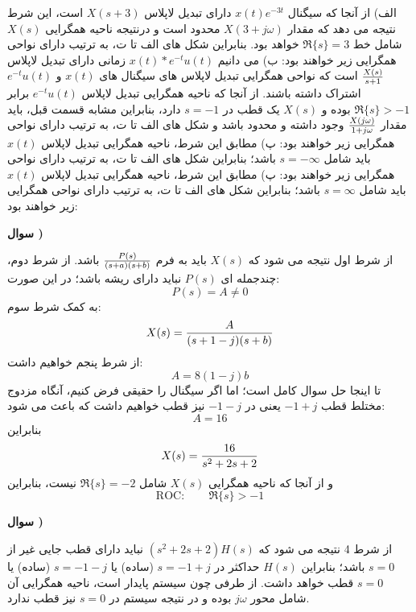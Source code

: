 \documentclass[10pt,letterpaper]{article}
\newcounter{QuestionNumber}
\newcommand{\Q}{
\textbf{
سوال \theQuestionNumber)
}
\stepcounter{QuestionNumber}
}
\begin{document}
الف) از آنجا که سیگنال 
$
x(t)e^{-3t}
$
 دارای تبدیل لاپلاس 
$
X(s+3)
$
است، این شرط نتیجه می دهد که مقدار 
$
X(3+j\omega)
$
محدود است و درنتیجه ناحیه همگرایی
$
X(s)
$
شامل خط
$
\Re\{s\}=3
$
 خواهد بود. بنابراین شکل های الف تا ت، به ترتیب دارای نواحی همگرایی زیر خواهند بود:
ب) می دانیم
$
x(t)*e^{-t}u(t)
$
زمانی دارای تبدیل لاپلاس 
$
{X(s)\over s+1}
$
 است که نواحی همگرایی تبدیل لاپلاس های سیگنال های 
$
x(t)
$
 و 
$
e^{-t}u(t)
$
اشتراک داشته باشند. از آنجا که ناحیه همگرایی تبدیل لاپلاس 
$
e^{-t}u(t)
$
 برابر 
$
\Re\{s\}>-1
$
بوده و 
$
X(s)
$
 یک قطب در 
$
s=-1
$
 دارد، بنابراین مشابه قسمت قبل، باید مقدار 
$
X(j\omega)\over 1+j\omega
$
 وجود داشته و محدود باشد و شکل های الف تا ت، به ترتیب دارای نواحی همگرایی زیر خواهند بود:
پ) مطابق این شرط، ناحیه همگرایی تبدیل لاپلاس 
$
x(t)
$
 باید شامل 
$
s=-\infty
$
 باشد؛ بنابراین شکل های الف تا ت، به ترتیب دارای نواحی همگرایی زیر خواهند بود:
پ) مطابق این شرط، ناحیه همگرایی تبدیل لاپلاس 
$
x(t)
$
 باید شامل 
$
s=\infty
$
 باشد؛ بنابراین شکل های الف تا ت، به ترتیب دارای نواحی همگرایی زیر خواهند بود:
\Q

از شرط اول نتیجه می شود که 
$
X(s)
$
 باید به فرم 
$
{P(s)\over(s+a)(s+b)}
$
باشد. از شرط دوم، چندجمله ای 
$
P(s)
$
 نباید دارای ریشه باشد؛ در این صورت:
$$
P(s)=A\ne 0
$$
به کمک شرط سوم:
$$
X(s)={A\over (s+1-j)(s+b)}
$$
از شرط پنجم خواهیم داشت:
$$
A=8(1-j)b
$$
تا اینجا حل سوال کامل است؛ اما اگر سیگنال را حقیقی فرض کنیم، آنگاه مزدوج مختلط قطب  $
-1+j
$
 یعنی در 
$
-1-j
$
 نیز قطب خواهیم داشت که باعث می شود:
$$
A=16
$$
بنابراین
$$
X(s)={16\over s^2+2s+2}
$$
و از آنجا که ناحیه همگرایی
$
X(s)
$
شامل 
$
\Re\{s\}=-2
$
 نیست، بنابراین
$$
\text{ROC}: \qquad \Re\{s\}>-1
$$

\Q

از شرط 4 نتیجه می شود که 
$
(s^2+2s+2)H(s)
$
 نباید دارای قطب جایی غیر از $s=0$ باشد؛ بنابراین 
$
H(s)
$
 حداکثر در 
$
s=-1+j
$
(ساده) یا 
$
s=-1-j
$
(ساده) یا 
$
s=0
$
 قطب خواهد داشت. از طرفی چون سیستم پایدار است، ناحیه همگرایی آن شامل محور $j\omega$ بوده و در نتیجه سیستم در $s=0$ نیز قطب ندارد.
\end{document}
